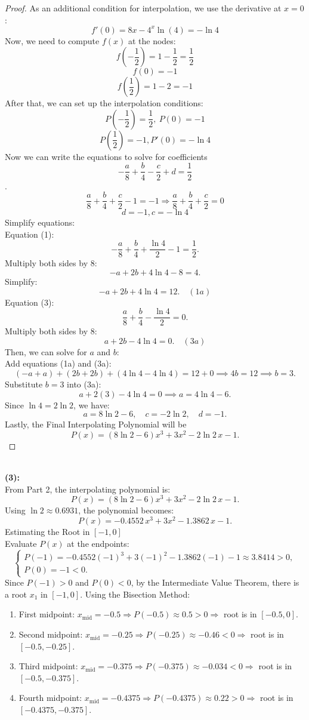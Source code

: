 \documentclass{article}
\begin{document}
\begin{proof}
As an additional condition for interpolation, we use the derivative at \( x = 0 \):
\[ f'(0) = 8x - 4^x \ln(4) = -\ln 4 \]
Now, we need to compute \( f(x) \) at the nodes:
\[ f\left( -\dfrac{1}{2} \right) = 1 - \dfrac{1}{2} = \dfrac{1}{2} \]
\[ f(0) = -1 \]
\[ f\left( \dfrac{1}{2} \right) = 1 - 2 = -1 \]
After that, we can set up the interpolation conditions:
\[ P\left( -\dfrac{1}{2} \right) = \dfrac{1}{2}, \ P(0) = -1 \]
\[ P\left( \dfrac{1}{2} \right) = -1, P'(0) = -\ln 4 \]
Now we can write the equations to solve for coefficients
\[ -\dfrac{a}{8} + \dfrac{b}{4} - \dfrac{c}{2} + d = \dfrac{1}{2} \].
\[ \dfrac{a}{8} + \dfrac{b}{4} + \dfrac{c}{2} -1 = -1 \Rightarrow \dfrac{a}{8} + \dfrac{b}{4} + \dfrac{c}{2} = 0 \]
\[ d = -1, c = -\ln 4 \]
Simplify equations:
\\
Equation (1):
\[
-\dfrac{a}{8} + \dfrac{b}{4} + \dfrac{\ln 4}{2} -1 = \dfrac{1}{2}.
\]
Multiply both sides by 8:
\[
- a + 2b + 4 \ln 4 -8 = 4.
\]
Simplify:
\[
- a + 2b + 4 \ln 4 = 12. \quad (1a)
\]
Equation (3):
\[
\dfrac{a}{8} + \dfrac{b}{4} - \dfrac{\ln 4}{2} = 0.
\]
Multiply both sides by 8:
\[
a + 2b - 4 \ln 4 = 0. \quad (3a)
\]
Then, we can solve for \( a \) and \( b \):
\\
Add equations (1a) and (3a):
\[
(-a + a) + (2b + 2b) + (4 \ln 4 - 4 \ln 4) = 12 + 0 \implies 4b = 12 \implies b = 3.
\]
Substitute \( b = 3 \) into (3a):
\[
a + 2(3) - 4 \ln 4 = 0 \implies a = 4 \ln 4 -6.
\]
Since \( \ln 4 = 2 \ln 2 \), we have:
\[
a = 8 \ln 2 -6, \quad c = -2 \ln 2, \quad d = -1.
\]
Lastly, the Final Interpolating Polynomial will be
\[
    P(x) = (8 \ln 2 -6) x^3 + 3 x^2 - 2 \ln 2 \, x -1.
\]
\end{proof}
\\
\textbf{(3): }
\\
From Part 2, the interpolating polynomial is:
\[
P(x) = (8 \ln 2 - 6) x^3 + 3 x^2 - 2 \ln 2 \, x - 1.
\]
Using \( \ln 2 \approx 0.6931 \), the polynomial becomes:
\[
P(x) = -0.4552\, x^3 + 3 x^2 - 1.3862\, x - 1.
\]
Estimating the Root in \([-1, 0]\)
\\
Evaluate \( P(x) \) at the endpoints:
\[
\begin{cases}
P(-1) = -0.4552(-1)^3 + 3(-1)^2 - 1.3862(-1) - 1 \approx 3.8414 > 0, \\
P(0) = -1 < 0.
\end{cases}
\]
Since \( P(-1) > 0 \) and \( P(0) < 0 \), by the Intermediate Value Theorem, there is a root \( x_1 \) in \([-1, 0]\).
Using the Bisection Method:
\begin{enumerate}
    \item First midpoint: \( x_{\text{mid}} = -0.5 \Rightarrow P(-0.5) \approx 0.5 > 0 \Rightarrow \) root is in \([-0.5, 0]\).
    \item Second midpoint: \( x_{\text{mid}} = -0.25 \Rightarrow P(-0.25) \approx -0.46 < 0 \Rightarrow \) root is in \([-0.5, -0.25]\).
    \item Third midpoint: \( x_{\text{mid}} = -0.375 \Rightarrow P(-0.375) \approx -0.034 < 0 \Rightarrow \) root is in \([-0.5, -0.375]\).
    \item Fourth midpoint: \( x_{\text{mid}} = -0.4375 \Rightarrow P(-0.4375) \approx 0.22 > 0 \Rightarrow \) root is in \([-0.4375, -0.375]\).
\end{enumerate}
\end{document}
